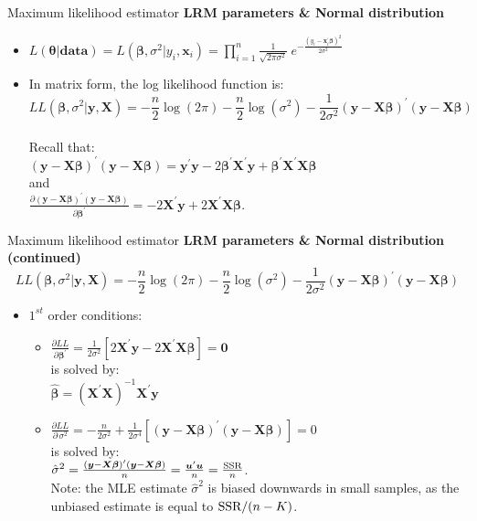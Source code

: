 \documentclass{beamer}
\begin{document}
\begin{frame}{Maximum likelihood estimator}
\textbf{LRM parameters \& Normal distribution} \\ \bigskip
\begin{itemize}
    \item $L(\bm{\theta}|\textbf{data})=L(\bm{\beta},\sigma^2|y_i,\bm{x}_i)=
    \displaystyle\prod_{i=1}^n \frac{1}{\sqrt{2\pi\sigma^2}}~e^{-\frac{(y_i-\bm{x}_i^{\prime}\bm{\beta})^2}{2\sigma^2}}$
    \smallskip
    \item In matrix form, the log likelihood function is:
    \footnotesize{
    $$
    LL(\bm{\beta},\sigma^2|\bm{y},\bm{X})= - \frac{n}{2} \log(2\pi) - \frac{n}{2} \log(\sigma^2) - \frac{1}{2\sigma^2}(\bm{y}-\bm{X \beta})^{\prime}(\bm{y}-\bm{X \beta})
    $$\\
    } %
    \bigskip
    Recall that:\\ \medskip
    $(\bm{y}-\bm{X \beta})^{\prime}(\bm{y}-\bm{X \beta})=
    \bm{y}^{\prime}\bm{y} - 2\bm{\beta}^{\prime}\bm{X}^{\prime}\bm{y}+\bm{\beta}^{\prime}\bm{X}^{\prime}\bm{X \beta}$\\ \smallskip
    and \\ \medskip
    $\frac{\partial (\bm{y}-\bm{X \beta})^{\prime}(\bm{y}-\bm{X \beta})}{\partial \bm{\beta}^{\prime}} = -2\bm{X}^{\prime}\bm{y}+2\bm{X}^{\prime}\bm{X \beta}$.
\end{itemize}
\end{frame}
\begin{frame}{Maximum likelihood estimator}
\textbf{LRM parameters \& Normal distribution (continued)} 
    $$
    LL(\bm{\beta},\sigma^2|\bm{y},\bm{X})= - \frac{n}{2} \log(2\pi) - \frac{n}{2} \log(\sigma^2) - \frac{1}{2\sigma^2}(\bm{y}-\bm{X \beta})^{\prime}(\bm{y}-\bm{X \beta})
    $$
\begin{itemize}
    \item $1^{st}$ order conditions:\\
    \medskip
    \begin{itemize}
        \item  $\frac{\partial LL}{\partial \bm{\beta}^{\prime}}=
    \frac{1}{2\sigma^2}[2\bm{X}^{\prime}\bm{y}-2\bm{X}^{\prime}\bm{X \beta}]=\bm{0}$\\ \medskip is solved by:\\ \medskip
    $\hat{\bm{\beta}} =(\bm{X}^{\prime}\bm{X})^{-1} \bm{X}^{\prime}\bm{y}$
    \bigskip
    \item $\frac{\partial LL}{\partial \, \sigma^2}=
    - \frac{n}{2\sigma^2}+\frac{1}{2\sigma^4}
    \left[ (\bm{y}-\bm{X \beta})^{\prime}(\bm{y}-\bm{X \beta}) \right] = 0$\\
    \medskip is solved by:\\ \medskip
    $\hat{\sigma}^2 = \frac{(\bm{y}-\bm{X \beta})^{\prime}(\bm{y}-\bm{X \beta})}{n} =  \frac{\bm{u}^{\prime}\bm{u}}{n} = \frac{\textnormal{SSR}}{n}$.\\ \medskip
    Note: the MLE estimate $\hat{\sigma}^2$ is biased downwards in small samples, as the unbiased estimate is equal to $\textnormal{SSR}/(n-K)$.
    \end{itemize}
\end{itemize}
\end{frame}
\end{document}
